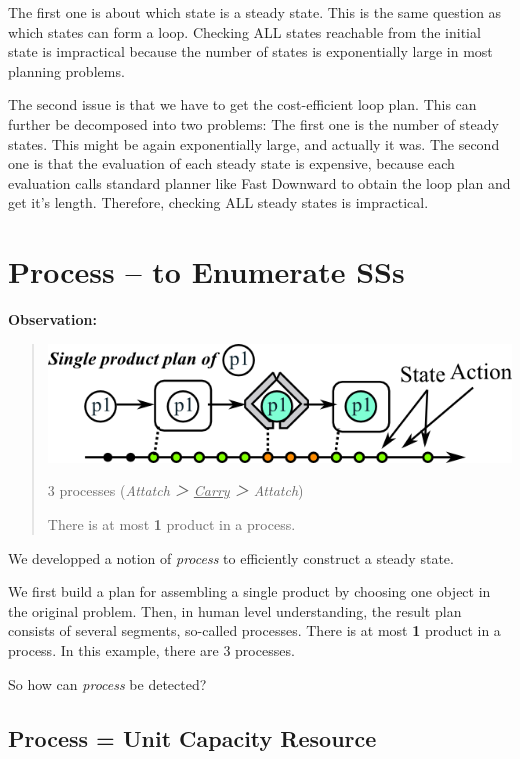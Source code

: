 \begin{resume}
The first one is about
which state is a steady state.
This is the same question as
which states can form a loop.
Checking ALL states reachable from the initial state is impractical
because the number of states
is exponentially large in most planning problems.

The second issue is that
we have to get the cost-efficient loop plan.
This can further be decomposed into two problems:
The first one is the number of steady states.
This might be again exponentially large, and actually it was.
The second one is that the evaluation of each steady state is expensive,
because each evaluation calls standard planner like Fast Downward
to obtain the loop plan and get it's length.
Therefore, checking ALL steady states is impractical.
\end{resume}

\section{Process -- to Enumerate SSs}
\label{sec-7}

\textbf{Observation:}

\begin{quote}
\includegraphics[width=.6\textwidth]{img/single-product-plan.png}

3 processes (\emph{Attatch ＞ \uline{Carry} ＞ Attatch})

There is at most \textbf{1} product in a process.
\end{quote}

\begin{resume}
We developped a notion of \emph{process} to efficiently
construct a steady state.

We first build a plan for assembling a single product
by choosing one object in the original problem.
Then, in human level understanding,
the result plan consists of several segments, so-called processes.
There is at most \textbf{1} product in a process.
In this example, there are 3 processes.


So how can \emph{process} be detected?
\end{resume}

\subsection{Process = Unit Capacity Resource}
\label{sec-7-1}

